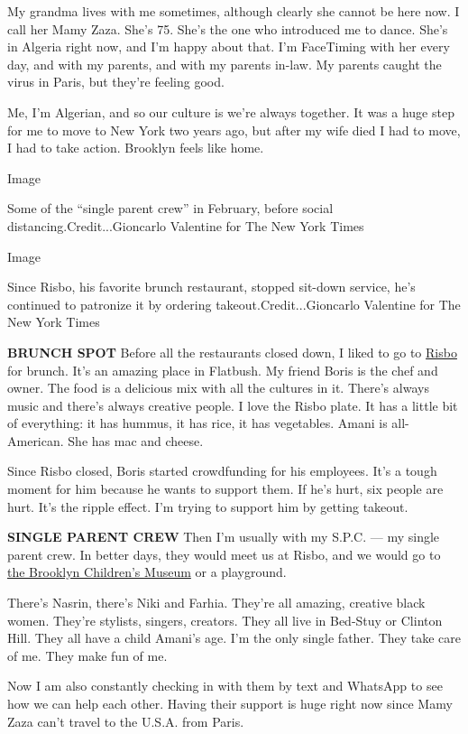 My grandma lives with me sometimes, although clearly she cannot be here
now. I call her Mamy Zaza. She's 75. She's the one who introduced me to
dance. She's in Algeria right now, and I'm happy about that. I'm
FaceTiming with her every day, and with my parents, and with my parents
in-law. My parents caught the virus in Paris, but they're feeling good.

Me, I'm Algerian, and so our culture is we're always together. It was a
huge step for me to move to New York two years ago, but after my wife
died I had to move, I had to take action. Brooklyn feels like home.

Image

Some of the ``single parent crew'' in February, before social
distancing.Credit...Gioncarlo Valentine for The New York Times

Image

Since Risbo, his favorite brunch restaurant, stopped sit-down service,
he's continued to patronize it by ordering takeout.Credit...Gioncarlo
Valentine for The New York Times

\textbf{BRUNCH SPOT} Before all the restaurants closed down, I liked to
go to \href{https://www.risbobk.com/}{Risbo} for brunch. It's an amazing
place in Flatbush. My friend Boris is the chef and owner. The food is a
delicious mix with all the cultures in it. There's always music and
there's always creative people. I love the Risbo plate. It has a little
bit of everything: it has hummus, it has rice, it has vegetables. Amani
is all-American. She has mac and cheese.

Since Risbo closed, Boris started crowdfunding for his employees. It's a
tough moment for him because he wants to support them. If he's hurt, six
people are hurt. It's the ripple effect. I'm trying to support him by
getting takeout.

\textbf{SINGLE PARENT CREW} Then I'm usually with my S.P.C. --- my
single parent crew. In better days, they would meet us at Risbo, and we
would go to \href{https://www.brooklynkids.org/}{the Brooklyn Children's
Museum} or a playground.

There's Nasrin, there's Niki and Farhia. They're all amazing, creative
black women. They're stylists, singers, creators. They all live in
Bed-Stuy or Clinton Hill. They all have a child Amani's age. I'm the
only single father. They take care of me. They make fun of me.

Now I am also constantly checking in with them by text and WhatsApp to
see how we can help each other. Having their support is huge right now
since Mamy Zaza can't travel to the U.S.A. from Paris.

